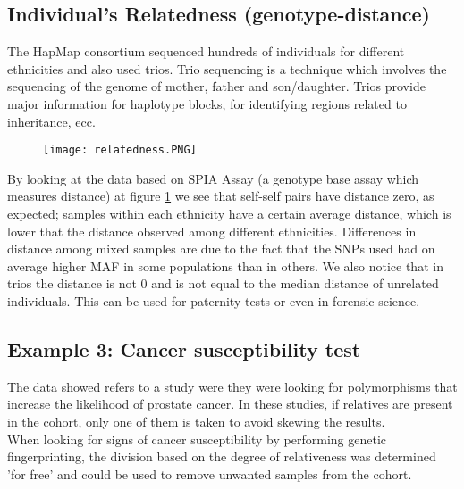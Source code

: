 \subsection{Individual's Relatedness (genotype-distance)}
The HapMap consortium sequenced hundreds of individuals for different ethnicities and also used trios. Trio sequencing is a technique which involves the sequencing of the genome of mother, father and son/daughter. Trios provide major information for haplotype blocks, for identifying regions related to inheritance, ecc.

\begin{figure}[H]
	\centering
	\texttt{[image: relatedness.PNG]}
	\caption{\label{fig:trios}}
\end{figure}

By looking at the data based on SPIA Assay (a genotype base assay which measures distance) at figure \ref*{fig:trios} we see that self-self pairs have distance zero, as expected; samples within each ethnicity have a certain average distance, which is lower that the distance observed among different ethnicities. Differences in distance among mixed samples are due to the fact that the SNPs used had on average higher MAF in some populations than in others. We also notice that in trios the distance is not 0 and is not equal to the median distance of unrelated individuals. This can be used for paternity tests or even in forensic science.

\subsection{Example 3: Cancer susceptibility test}
The data showed refers to a study were they were looking for polymorphisms that increase the likelihood of prostate cancer. In these studies, if relatives are present in the cohort, only one of them is taken to avoid skewing the results. \\
When looking for signs of cancer susceptibility by performing genetic fingerprinting, the division based on the degree of relativeness was determined 'for free' and could be used to remove unwanted samples from the cohort.


